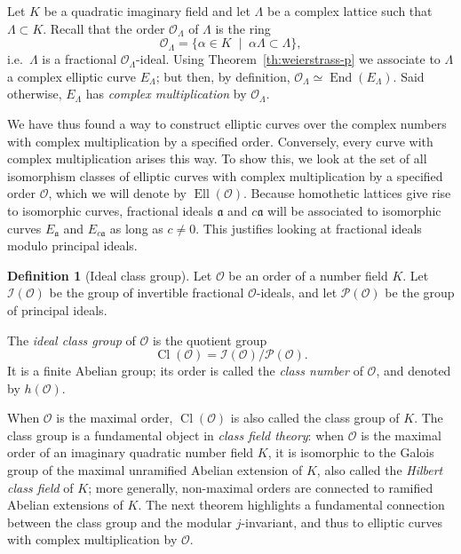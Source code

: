 \documentclass[10pt]{article}
\theoremstyle{plain}
\theoremstyle{definition}
\newtheorem{definition}[theorem]{Definition}
\DeclareMathOperator{\End}{End} %
\DeclareMathOperator{\Cl}{Cl}
\DeclareMathOperator{\Ell}{Ell}
\def\O{\ensuremath{\mathcal{O}}}
\def\a{\ensuremath{\mathfrak{a}}}
\begin{document}
Let $K$ be a quadratic imaginary field and let $Λ$ be a complex
lattice such that $Λ⊂K$. %
Recall that the order $\O_Λ$ of $Λ$ is the ring
\begin{equation}
  \label{eq:lattice-order}
  \O_Λ = \{ α ∈ K \;\mid\; αΛ ⊂ Λ \},
\end{equation}
i.e.\ $Λ$ is a fractional $\O_Λ$-ideal. %
Using Theorem~\ref{th:weierstrass-p} we associate to $Λ$ a complex
elliptic curve $E_Λ$; but then, by definition, $\O_Λ≃\End(E_Λ)$. %
Said otherwise, $E_Λ$ has \emph{complex multiplication} by $\O_Λ$.

We have thus found a way to construct elliptic curves over the complex
numbers with complex multiplication by a specified order. %
Conversely, every curve with complex multiplication arises this way. %
To show this, we look at the set of all isomorphism classes of
elliptic curves with complex multiplication by a specified order $\O$,
which we will denote by $\Ell(\O)$. %
Because homothetic lattices give rise to isomorphic curves, fractional
ideals $\a$ and $c\a$ will be associated to isomorphic curves $E_\a$
and $E_{c\a}$ as long as $c≠0$. %
This justifies looking at fractional ideals modulo principal ideals.

\begin{definition}[Ideal class group]
  Let $\O$ be an order of a number field $K$. %
  Let $\mathcal{I}(\O)$ be the group of invertible fractional
  $\O$-ideals, and let $\mathcal{P}(\O)$ be the group of principal
  ideals. %

  The \emph{ideal class group} of $\O$ is the quotient group
  \[\Cl(\O) = \mathcal{I}(\O)/\mathcal{P}(\O).\]
  It is a finite Abelian group; its order is called the \emph{class
    number} of $\O$, and denoted by $h(\O)$.
\end{definition}

When $\O$ is the maximal order, $\Cl(\O)$ is also called the class
group of $K$. %
The class group is a fundamental object in \emph{class field theory}:
when $\O$ is the maximal order of an imaginary quadratic number field
$K$, it is isomorphic to the Galois group
of the maximal unramified Abelian extension of $K$, also called the
\emph{Hilbert class field} of $K$; more generally, non-maximal orders
are connected to ramified Abelian extensions of $K$. %
The next theorem highlights a fundamental connection between the class
group and the modular $j$-invariant, and thus to elliptic curves with
complex multiplication by $\O$.
\end{document}
